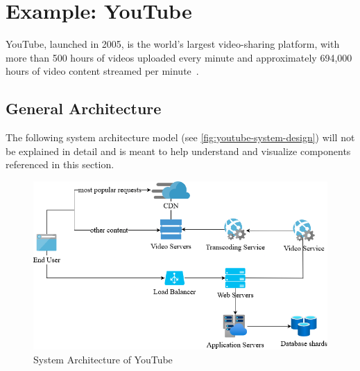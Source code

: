 \section{Example: YouTube}

YouTube, launched in 2005, is the world's largest video-sharing platform, with more than 500 hours of videos uploaded every minute and approximately 694,000 hours of video content streamed per minute~\parencite{youtube_stats}.

\subsection{General Architecture}

The following system architecture model (see \autoref{fig:youtube-system-design}) will not be explained in detail and is meant to help understand and visualize components referenced in this section.

\begin{figure}[htpb]
    \centering
    \includegraphics[width=350pt]{images/YoutubeSystemArchitecture.png}
    \caption[System Architecture of YouTube]{System Architecture of YouTube}\label{fig:youtube-system-design}
\end{figure}


